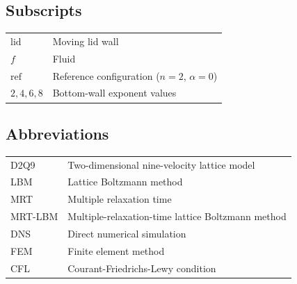 \subsection*{Subscripts}
\begin{tabular}{@{}ll@{}}
$\mathrm{lid}$  & Moving lid wall \\
$f$            & Fluid \\
$\mathrm{ref}$  & Reference configuration ($n=2$, $\alpha=0$) \\
$2,4,6,8$      & Bottom-wall exponent values
\end{tabular}

\subsection*{Abbreviations}
\begin{tabular}{@{}ll@{}}
D2Q9 & Two-dimensional nine-velocity lattice model \\
LBM  & Lattice Boltzmann method \\
MRT  & Multiple relaxation time \\
MRT-LBM & Multiple-relaxation-time lattice Boltzmann method \\
DNS  & Direct numerical simulation \\
FEM  & Finite element method \\
CFL  & Courant-Friedrichs-Lewy condition
\end{tabular}

